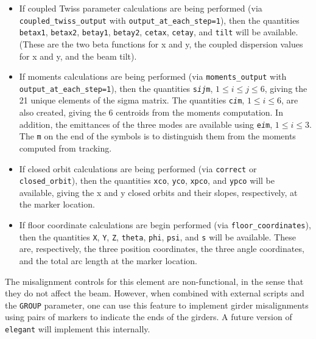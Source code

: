 \begin{itemize}
  {\tt alphax}, {\tt betax}, {\tt nux}, {\tt psix}, {\tt etax}, {\tt etapx}, and {\tt etaxp}, along with similarly-named
  quantities for the vertical plane, will be available, giving twiss parameter values at the marker location.
  Note that {\tt etapx} and {\tt etaxp} are the same, being alternate names for $\eta_x^\prime$.  If radiation integrals are requested,
  the values of the radiation integrals are available in the quantities {\tt I1}, {\tt I2}, etc.
\item If coupled Twiss parameter calculations are being performed (via {\tt coupled\_twiss\_output} with {\tt output\_at\_each\_step=1}),
  then the quantities  \verb|betax1|, \verb|betax2|, \verb|betay1|, \verb|betay2|, \verb|cetax|, \verb|cetay|, and \verb|tilt| will be available.
  (These are the two beta functions for x and y, the coupled dispersion values for x and y, and the beam tilt). 
\item If moments calculations are being performed (via {\tt moments\_output} with  {\tt output\_at\_each\_step=1}), then the quantities 
 {\tt s{\em i}{\em j}m}, $1 \leq i\leq j\leq 6$, giving the 21 unique elements of the sigma matrix.  The quantities {\tt c{\em i}m}, $1\leq i \leq 6$,
 are also created, giving the 6 centroids from the moments computation. In addition, the emittances of the three modes are available using 
 {\tt e{\em i}m}, $1\leq i \leq 3$. The {\tt m} on the end of the symbols is to distinguish them from the moments computed from tracking.
\item If closed orbit calculations are being performed (via {\tt correct} or {\tt closed\_orbit}), then
  the quantities {\tt xco}, {\tt yco}, {\tt xpco}, and {\tt ypco} will be available, giving the
  x and y closed orbits and their slopes, respectively, at the marker location.
\item If floor coordinate calculations are begin performed (via {\tt floor\_coordinates}), then the quantities
  {\tt X}, {\tt Y}, {\tt Z}, {\tt theta}, {\tt phi}, {\tt psi}, and {\tt s} will be available.  These are,
  respectively, the three position coordinates, the three angle coordinates, and the total arc length
  at the marker location.
\end{itemize}

The misalignment controls for this element are non-functional, in the sense that they do not affect the beam.
However, when combined with external scripts and the \verb|GROUP| parameter, one can use this feature to
implement girder misalignments using pairs of markers to indicate the ends of the girders.  A future version
of {\tt elegant} will implement this internally.
